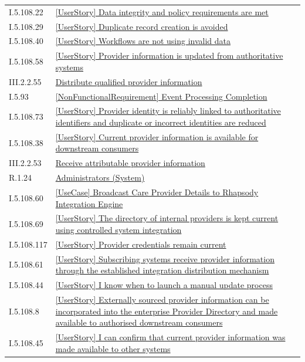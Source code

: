 \begin{longtable}{p{.22\linewidth}p{.73\linewidth}}
I.5.108.22 & \hyperref[element:c2adec8b5e47434da70f29086b4bec42]{[UserStory] Data integrity and policy requirements are met} \\
I.5.108.29 & \hyperref[element:c3bcfb16be2e4aa7904ff27cf3b06637]{[UserStory] Duplicate record creation is avoided} \\
I.5.108.40 & \hyperref[element:ccda152b9e0f447d9a3eebc9c9d26139]{[UserStory] Workflows are not using invalid data} \\
I.5.108.58 & \hyperref[element:cf5b349daa7f47ba87b491f64907a7c0]{[UserStory] Provider information is updated from authoritative systems} \\
III.2.2.55 & \hyperref[element:cfa9cb430ecd464dae89c710c4a040b5]{Distribute qualified provider information} \\
I.5.93 & \hyperref[element:d1380eec700a492b810354e0798c8146]{[NonFunctionalRequirement] Event Processing Completion} \\
I.5.108.73 & \hyperref[element:d7eb877a185b4d698336b185c0d3370d]{[UserStory] Provider identity is reliably linked to authoritative identifiers and duplicate or incorrect identities are reduced} \\
I.5.108.38 & \hyperref[element:dabbc9fbbd894e4f9bcd1da67726411e]{[UserStory] Current provider information is available for downstream consumers} \\
III.2.2.53 & \hyperref[element:db6083a887c24c55a32715f0c331c5d2]{Receive attributable provider information} \\
R.1.24 & \hyperref[element:ddeedc03593c4d658f6aa053d13767c5]{Administrators (System)} \\
I.5.108.60 & \hyperref[element:e2b205993c4a45949141099967e42110]{[UseCase] Broadcast Care Provider Details to Rhapsody Integration Engine} \\
I.5.108.69 & \hyperref[element:e982ab89dee34e7b92b68b876c81b4d9]{[UserStory] The directory of internal providers is kept current using controlled system integration} \\
I.5.108.117 & \hyperref[element:ea930778a2e34b599e568927affc6d5a]{[UserStory] Provider credentials remain current} \\
I.5.108.61 & \hyperref[element:eb28c67d69514ce79a4d8e7aee8884d2]{[UserStory] Subscribing systems receive provider information through the established integration distribution mechanism} \\
I.5.108.44 & \hyperref[element:eb2d8bce26dd4fabaf4a0524dfe89193]{[UserStory] I know when to launch a manual update process} \\
I.5.108.8 & \hyperref[element:ebd6c8a0f6cb424389b6a89711bf1937]{[UserStory] Externally sourced provider information can be incorporated into the enterprise Provider Directory and made available to authorised downstream consumers} \\
I.5.108.45 & \hyperref[element:f7b22147a3d143dea4471d6305238b72]{[UserStory] I can confirm that current provider information was made available to other systems} \\
\end{longtable}
